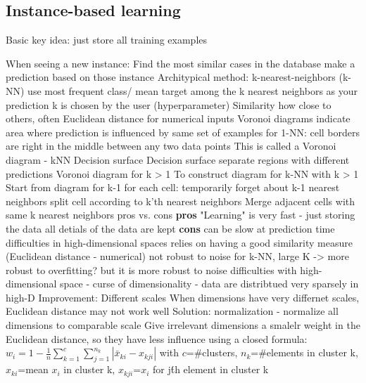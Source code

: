 \subsection{Instance-based learning}
Basic key idea: just store all training examples
\begin{outline}
    \1 When seeing a new instance:
        \2 Find the most similar cases in the database
        \2 make a prediction based on those instance
    \1 Architypical method: k-nearest-neighbors (k-NN)
        \2 use most frequent class/ mean target among the k nearest neighbors as your prediction
        \2 k is chosen by the user (hyperparameter)
    \1 Similarity
        \2 how close to others, often Euclidean distance for numerical inputs
    \1 Voronoi diagrams
        \2 indicate area where prediction is influenced by same set of examples
        \2 for 1-NN: cell borders are right in the middle between any two data points
        \2 This is called a Voronoi diagram - kNN
    \1 Decision surface
        \2 Decision surface separate regions with different predictions
    \1 Voronoi diagram for k > 1
        \2 To construct diagram for k-NN with k > 1
             \3 Start from diagram for k-1
             \3 for each cell:
                \4 temporarily forget about k-1 nearest neighbors
                \4 split cell according to k'th nearest neighbors
            \3 Merge adjacent cells with same k nearest neighbors
    \1 pros vs. cons
        \2 \textbf{pros}
            \3 "Learning" is very fast - just storing the data
            \3 all detials of the data are kept
        \2 \textbf{cons}
            \3 can be slow at prediction time
            \3 difficulties in high-dimensional spaces
            \3 relies on having a good similarity measure (Euclidean distance - numerical)
            \3 not robust to noise
    \1 for k-NN, large K -> more robust to overfitting? but it is more robust to noise
    \1 difficulties with high-dimensional space - curse of dimensionality - data are distribtued very sparsely in high-D
    \1 Improvement: Different scales
        \2 When dimensions have very differnet scales, Euclidean distance may not work well
            \3 Solution: normalization - normalize all dimensions to comparable scale
            \3 Give irrelevant dimensions a smalelr weight in the Euclidean distance, so they have less influence
            \3 using a closed formula: $w_{i} = 1 - \frac{1}{n} \sum_{k=1}^{c} \sum_{j=1}^{n_{k}} |\bar{x}_{ki} - x_{kji}|$
            \3 with $c$=\#clusters, $n_{k}$=\#elements in cluster k, $x_{ki}$=mean $x_{i}$ in cluster k, $x_{kji}$=$x_{i}$ for j\'th element in cluster k

\end{outline}
